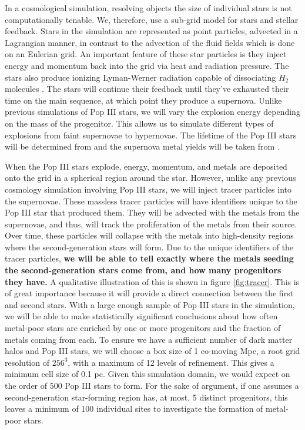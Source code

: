 \documentclass[a4paper, 12pt]{article}
\begin{document}
In a cosmological simulation, resolving objects the size of individual stars is not computationally tenable. We, therefore, use a sub-grid model for stars and stellar feedback. Stars in the simulation are represented as point particles, advected in a Lagrangian manner, in contrast to the advection of the fluid fields which is done on an Eulerian grid. An important feature of these star particles is they inject energy and momentum back into the grid via heat and radiation pressure. The stars also produce ionizing Lyman-Werner radiation capable of dissociating $H_2$ molecules \citep{...}. The stars will continue their feedback until they've exhausted their time on the main sequence, at which point they produce a supernova. Unlike previous simulations of Pop III stars, we will vary the explosion energy depending on the mass of the progenitor. This allows us to simulate different types of explosions from faint supernovae to hypernovae. The lifetime of the Pop III stars will be determined from \cite{Schaerer2002} and the supernova metal yields will be taken from \cite{Nomoto2006}.

When the Pop III stars explode, energy, momentum, and metals are deposited onto the grid in a spherical region around the star. However, unlike any previous cosmology simulation involving Pop III stars, we will inject tracer particles into the supernovae. These massless tracer particles will have identifiers unique to the Pop III star that produced them. They will be advected with the metals from the supernovae, and thus, will track the proliferation of the metals from their source. Over time, these particles will collapse with the metals into high-density regions where the second-generation stars will form. Due to the unique identifiers of the tracer particles, \textbf{we will be able to tell exactly where the metals seeding the second-generation stars come from, and how many progenitors they have.} A qualitative illustration of this is shown in figure \ref{fig:tracer}. This is of great importance because it will provide a direct connection between the first and second stars. With a large enough sample of Pop III stars in the simulation, we will be able to make statistically significant conclusions about how often metal-poor stars are enriched by one or more progenitors and the fraction of metals coming from each. To ensure we have a sufficient number of dark matter halos and Pop III stars, we will choose a box size of 1 co-moving Mpc, a root grid resolution of $256^3$, with a maximum of 12 levels of refinement. This gives a minimum cell size of 0.1 pc. Given this simulation domain, we would expect on the order of 500 Pop III stars to form. For the sake of argument, if one assumes a second-generation star-forming region has, at most, 5 distinct progenitors, this leaves a minimum of 100 individual sites to investigate the formation of metal-poor stars.
\end{document}
